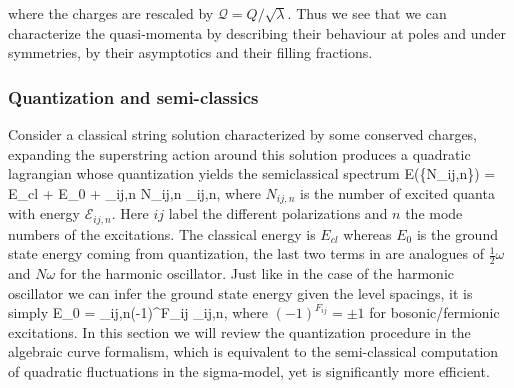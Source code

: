 where the charges are rescaled by $\mathcal{Q} = Q / \sqrt{\lambda}$. 
Thus we see that we can characterize the quasi-momenta by describing their behaviour at poles and under symmetries, by their asymptotics and their filling fractions. 


\subsubsection{Quantization and semi-classics}

Consider a classical string solution characterized by some conserved charges, expanding the superstring action around this solution produces a quadratic lagrangian whose quantization yields the semiclassical spectrum
\beq
	\label{eq:quant_energy_full}
	E(\{N_{ij,n}\}) = E_{cl} + E_0 + \sum_{ij,n} N_{ij,n} _{ij,n},
\eeq
where $N_{ij,n}$ is the number of excited quanta with energy $\mathcal{E}_{ij,n}$. Here $ij$ label the different polarizations and $n$ the mode numbers of the excitations. The classical energy is $E_{cl}$ whereas $E_0$ is the ground state energy coming from quantization, the last two terms in  are analogues of $\frac{1}{2} \omega$ and $N \omega$ for the harmonic oscillator. Just like in the case of the harmonic oscillator we can infer the ground state energy given the level spacings, it is simply
\beq
	E_0 =  \sum_{ij,n}(-1)^{F_{ij}} _{ij,n},
\eeq
where $(-1)^{F_{ij}} = \pm 1$ for bosonic/fermionic excitations. In this section we will review the quantization procedure in the algebraic curve formalism, which is equivalent to the semi-classical computation of quadratic fluctuations in the sigma-model, yet is significantly more efficient.

